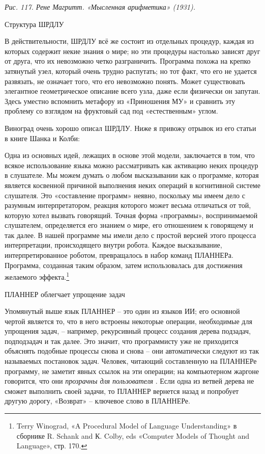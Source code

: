 \documentclass[../main.tex]{subfiles}
\begin{document}
\emph{Рис. 117. Рене Магритт. «Мысленная арифметика» (1931).}

Структура ШРДЛУ

В действительности, ШРДЛУ всё же состоит из отдельных процедур, каждая из которых содержит некие знания о мире; но эти процедуры настолько зависят друг от друга, что их невозможно четко разграничить. Программа похожа на крепко затянутый узел, который очень трудно распутать; но тот факт, что его не удается развязать, не означает того, что его невозможно понять. Может существовать элегантное геометрическое описание всего узла, даже если физически он запутан. Здесь уместно вспомнить метафору из «Приношения МУ» и сравнить эту проблему со взглядом на фруктовый сад под «естественным» углом.

Виноград очень хорошо описал ШРДЛУ. Ниже я привожу отрывок из его статьи в книге Шанка и Колби:

Одна из основных идей, лежащих в основе этой модели, заключается в том, что всякое использование языка можно рассматривать как активацию неких процедур в слушателе. Мы можем думать о любом высказывании как о программе, которая является косвенной причиной выполнения неких операций в когнитивной системе слушателя. Это «составление программ» неявно, поскольку мы имеем дело с разумным интерпретатором, реакция которого может весьма отличаться от той, которую хотел вызвать говорящий. Точная форма «программы», воспринимаемой слушателем, определяется его знанием о мире, его отношением к говорящему и так далее. В нашей программе мы имели дело с простой версией этого процесса интерпретации, происходящего внутри робота. Каждое высказывание, интерпретированное роботом, превращалось в набор команд ПЛАННЕРа. Программа, созданная таким образом, затем использовалась для достижения желаемого эффекта.\footnote{Terry Winograd, «A Procedural Model of Language Understanding» в сборнике R. Schank and К. Colby, eds «Computer Models of Thought and Language», стр. 170.}

ПЛАННЕР облегчает упрощение задач

Упомянутый выше язык ПЛАННЕР \--- это один из языков ИИ; его основной чертой является то, что в него встроены некоторые операции, необходимые для упрощения задач, \--- например, рекурсивный процесс создания дерева подзадач, подподзадач и так далее. Это значит, что программисту уже не приходится объяснять подобные процессы снова и снова \--- они автоматически следуют из так называемых постановок задач. Человек, читающий составленную на ПЛАННЕРе программу, не заметит явных ссылок на эти операции; на компьютерном жаргоне говорится, что они \emph{прозрачны для пользователя} . Если одна из ветвей дерева не сможет выполнить своей задачи, то ПЛАННЕР вернется назад и попробует другую дорогу, «Возврат» \--- ключевое слово в ПЛАННЕРе.
\end{document}
